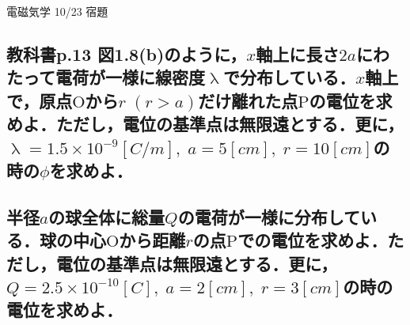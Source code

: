 \documentclass[a4j,12pt]{jsarticle}
\begin{document}
\begin{center}
    \begin{LARGE}
        {\huge 電磁気学 10/23 宿題} 
    \end{LARGE}
\end{center}

\subsection{教科書p.13 図1.8(b)のように，\(x\)軸上に長さ\(2a\)にわたって電荷が一様に線密度\(\uplambda\)で分布している．\(x\)軸上で，原点\(\mathrm{O}\)から\(r\;(r>a)\)だけ離れた点\(\mathrm{P}\)の電位を求めよ．ただし，電位の基準点は無限遠とする．更に，\(\uplambda=1.5\times10^{-9}\si{[C/m]},\;a=5\si{[cm]},\;r=10\si{[cm]}\)の時の\(\phi\)を求めよ．}

\vspace{20em}

\subsection{半径\(a\)の球全体に総量\(Q\)の電荷が一様に分布している．球の中心\(\mathrm{O}\)から距離\(r\)の点\(\mathrm{P}\)での電位を求めよ．ただし，電位の基準点は無限遠とする．更に，\(Q=2.5\times10^{-10}\si{[C]},\;a=2\si{[cm]},\;r=3\si{[cm]}\)の時の電位を求めよ．}
\end{document}
